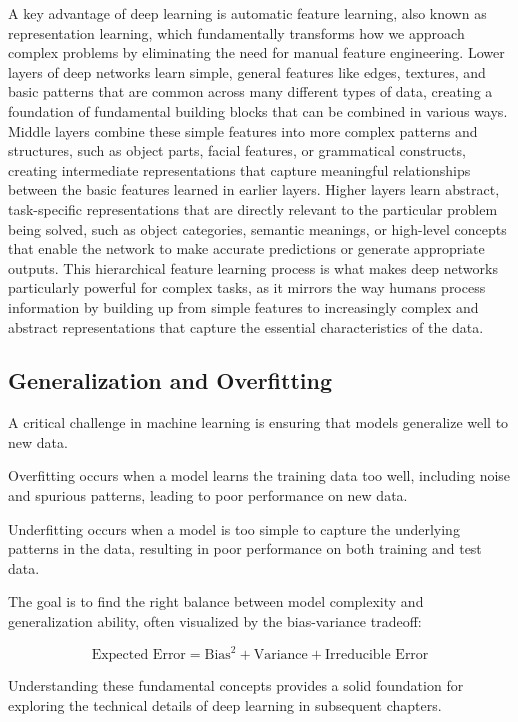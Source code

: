 A key advantage of deep learning is automatic feature learning, also known as representation learning, which fundamentally transforms how we approach complex problems by eliminating the need for manual feature engineering. Lower layers of deep networks learn simple, general features like edges, textures, and basic patterns that are common across many different types of data, creating a foundation of fundamental building blocks that can be combined in various ways. Middle layers combine these simple features into more complex patterns and structures, such as object parts, facial features, or grammatical constructs, creating intermediate representations that capture meaningful relationships between the basic features learned in earlier layers. Higher layers learn abstract, task-specific representations that are directly relevant to the particular problem being solved, such as object categories, semantic meanings, or high-level concepts that enable the network to make accurate predictions or generate appropriate outputs. This hierarchical feature learning process is what makes deep networks particularly powerful for complex tasks, as it mirrors the way humans process information by building up from simple features to increasingly complex and abstract representations that capture the essential characteristics of the data.

\subsection{Generalization and Overfitting}

A critical challenge in machine learning is ensuring that models generalize well to new data.

\begin{definition}[Overfitting]
Overfitting occurs when a model learns the training data too well, including noise and spurious patterns, leading to poor performance on new data.
\end{definition}

\begin{definition}[Underfitting]
Underfitting occurs when a model is too simple to capture the underlying patterns in the data, resulting in poor performance on both training and test data.
\end{definition}

The goal is to find the right balance between model complexity and generalization ability, often visualized by the bias-variance tradeoff:

\begin{equation}
    \text{Expected Error} = \text{Bias}^2 + \text{Variance} + \text{Irreducible Error}
\end{equation}

Understanding these fundamental concepts provides a solid foundation for exploring the technical details of deep learning in subsequent chapters.
